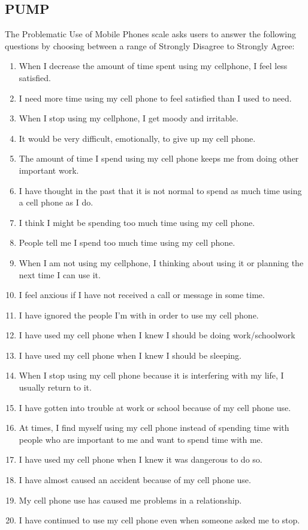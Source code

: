 \documentclass[12pt, title page, manuscript, nonacm]{acmart}
\begin{document}
\subsection*{PUMP}
The Problematic Use of Mobile Phones scale asks users to answer the following questions by choosing between a range of Strongly Disagree to Strongly Agree:
\begin{enumerate}
    \item When I decrease the amount of time spent using my cellphone, I feel less satisfied.
    \item I need more time using my cell phone to feel satisfied than I used to need.
    \item When I stop using my cellphone, I get moody and irritable.
    \item It would be very difficult, emotionally, to give up my cell phone.
    \item The amount of time I spend using my cell phone keeps me from doing other important work.
    \item I have thought in the past that it is not normal to spend as much time using a cell phone as I do.
    \item I think I might be spending too much time using my cell phone.
    \item People tell me I spend too much time using my cell phone.
    \item When I am not using my cellphone, I thinking about using it or planning the next time I can use it.
    \item I feel anxious if I have not received a call or message in some time.
    \item I have ignored the people I'm with in order to use my cell phone.
    \item I have used my cell phone when I knew I should be doing work/schoolwork
    \item I have used my cell phone when I knew I should be sleeping.
    \item When I stop using my cell phone because it is interfering with my life, I usually return to it.
    \item I have gotten into trouble at work or school because of my cell phone use.
    \item At times, I find myself using my cell phone instead of spending time with people who are important to me and want to spend time with me.
    \item I have used my cell phone when I knew it was dangerous to do so.
    \item I have almost caused an accident because of my cell phone use.
    \item My cell phone use has caused me problems in a relationship.
    \item I have continued to use my cell phone even when someone asked me to stop.
\end{enumerate}
\end{document}
